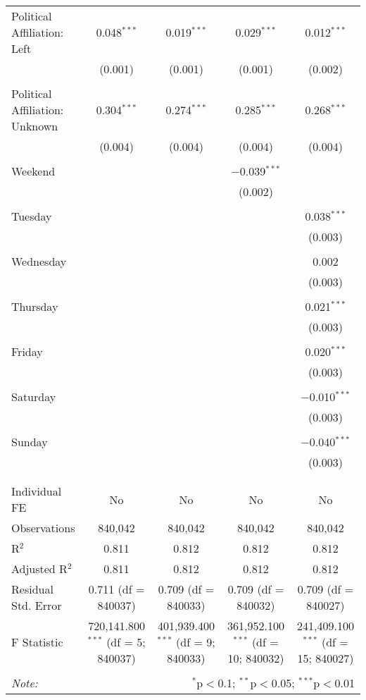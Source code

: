 \documentclass[
]{article}
\begin{document}
\begin{table}[!htbp]
{\begin{tabular}{@{\extracolsep{5pt}}lcccc}
 Political Affiliation: Left & 0.048$^{***}$ & 0.019$^{***}$ & 0.029$^{***}$ & 0.012$^{***}$ \\ 
  & (0.001) & (0.001) & (0.001) & (0.002) \\ 
  & & & & \\ 
 Political Affiliation: Unknown & 0.304$^{***}$ & 0.274$^{***}$ & 0.285$^{***}$ & 0.268$^{***}$ \\ 
  & (0.004) & (0.004) & (0.004) & (0.004) \\ 
  & & & & \\ 
 Weekend &  &  & $-$0.039$^{***}$ &  \\ 
  &  &  & (0.002) &  \\ 
  & & & & \\ 
 Tuesday &  &  &  & 0.038$^{***}$ \\ 
  &  &  &  & (0.003) \\ 
  & & & & \\ 
 Wednesday &  &  &  & 0.002 \\ 
  &  &  &  & (0.003) \\ 
  & & & & \\ 
 Thursday &  &  &  & 0.021$^{***}$ \\ 
  &  &  &  & (0.003) \\ 
  & & & & \\ 
 Friday &  &  &  & 0.020$^{***}$ \\ 
  &  &  &  & (0.003) \\ 
  & & & & \\ 
 Saturday &  &  &  & $-$0.010$^{***}$ \\ 
  &  &  &  & (0.003) \\ 
  & & & & \\ 
 Sunday &  &  &  & $-$0.040$^{***}$ \\ 
  &  &  &  & (0.003) \\ 
  & & & & \\ 
\hline \\[-1.8ex] 
Individual FE & No & No & No & No \\ 
Observations & 840,042 & 840,042 & 840,042 & 840,042 \\ 
R$^{2}$ & 0.811 & 0.812 & 0.812 & 0.812 \\ 
Adjusted R$^{2}$ & 0.811 & 0.812 & 0.812 & 0.812 \\ 
Residual Std. Error & 0.711 (df = 840037) & 0.709 (df = 840033) & 0.709 (df = 840032) & 0.709 (df = 840027) \\ 
F Statistic & 720,141.800$^{***}$ (df = 5; 840037) & 401,939.400$^{***}$ (df = 9; 840033) & 361,952.100$^{***}$ (df = 10; 840032) & 241,409.100$^{***}$ (df = 15; 840027) \\ 
\hline 
\hline \\[-1.8ex] 
\textit{Note:}  & \multicolumn{4}{r}{$^{*}$p$<$0.1; $^{**}$p$<$0.05; $^{***}$p$<$0.01} \\ 
\end{tabular}
} 
\end{table} 
\newpage
\end{document}
